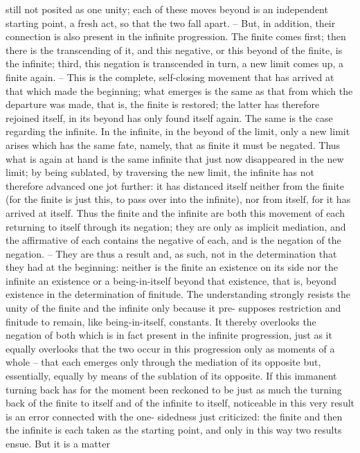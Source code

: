 still not posited as one unity; each of these moves beyond is an independent
starting point, a fresh act, so that the two fall apart. – But, in addition, their
connection is also present in the infinite progression. The finite comes first;
then there is the transcending of it, and this negative, or this beyond of the
finite, is the infinite; third, this negation is transcended in turn, a new limit
comes up, a finite again. – This is the complete, self-closing movement that
has arrived at that which made the beginning; what emerges is the same as
that from which the departure was made, that is, the finite is restored; the
latter has therefore rejoined itself, in its beyond has only found itself again.
The same is the case regarding the infinite. In the infinite, in the beyond
of the limit, only a new limit arises which has the same fate, namely, that
as finite it must be negated. Thus what is again at hand is the same infinite
that just now disappeared in the new limit; by being sublated, by traversing
the new limit, the infinite has not therefore advanced one jot further: it
has distanced itself neither from the finite (for the finite is just this, to pass
over into the infinite), nor from itself, for it has arrived at itself.
Thus the finite and the infinite are both this movement of each returning
to itself through its negation; they are only as implicit mediation, and the
affirmative of each contains the negative of each, and is the negation of the
negation. – They are thus a result and, as such, not in the determination
that they had at the beginning: neither is the finite an existence on its side
nor the infinite an existence or a being-in-itself beyond that existence, that
is, beyond existence in the determination of finitude. The understanding
strongly resists the unity of the finite and the infinite only because it pre-
supposes restriction and finitude to remain, like being-in-itself, constants.
It thereby overlooks the negation of both which is in fact present in the
infinite progression, just as it equally overlooks that the two occur in this
progression only as moments of a whole – that each emerges only through
the mediation of its opposite but, essentially, equally by means of the
sublation of its opposite.
If this immanent turning back has for the moment been reckoned to
be just as much the turning back of the finite to itself and of the infinite
to itself, noticeable in this very result is an error connected with the one-
sidedness just criticized: the finite and then the infinite is each taken as
the starting point, and only in this way two results ensue. But it is a matter
